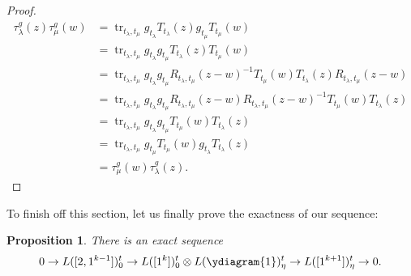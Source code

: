 \documentclass[11pt]{report}
\newtheorem{prop}[theorem]{Proposition}
\theoremstyle{definition}
\theoremstyle{remark}
\theoremstyle{remark}
\begin{document}
\begin{proof}
\begin{align*}
\tau_\lambda^g(z) \tau_\mu^g(w)
&= \operatorname{tr}_{t_\lambda,t_\mu} g_{t_\lambda} T_{t_\lambda}(z) g_{t_\mu} T_{t_\mu}(w) \\
&= \operatorname{tr}_{t_\lambda,t_\mu} g_{t_\lambda} g_{t_\mu} T_{t_\lambda}(z) T_{t_\mu}(w) \\
&= \operatorname{tr}_{t_\lambda,t_\mu} g_{t_\lambda} g_{t_\mu} R_{t_\lambda,t_\mu}(z-w)^{-1} T_{t_\mu}(w) T_{t_\lambda}(z) R_{t_\lambda,t_\mu}(z-w) \\
&= \operatorname{tr}_{t_\lambda,t_\mu} g_{t_\lambda} g_{t_\mu} R_{t_\lambda,t_\mu}(z-w) R_{t_\lambda,t_\mu}(z-w)^{-1} T_{t_\mu}(w) T_{t_\lambda}(z) \\
&= \operatorname{tr}_{t_\lambda,t_\mu} g_{t_\lambda} g_{t_\mu} T_{t_\mu}(w) T_{t_\lambda}(z) \\
&= \operatorname{tr}_{t_\lambda,t_\mu} g_{t_\mu} T_{t_\mu}(w) g_{t_\lambda} T_{t_\lambda}(z) \\
&= \tau_\mu^g(w) \tau_\lambda^g(z).
\end{align*}
\end{proof}

To finish off this section, let us finally prove the exactness of our sequence:

\begin{prop}
There is an exact sequence
\begin{equation*}
0 \to L([2,1^{k-1}])_0^t \to L([1^k])_0^t \otimes L(\ydiagram{1})_\eta^t \to L([1^{k+1}])_\eta^t \to 0.
\end{equation*}
\end{prop}
\end{document}
